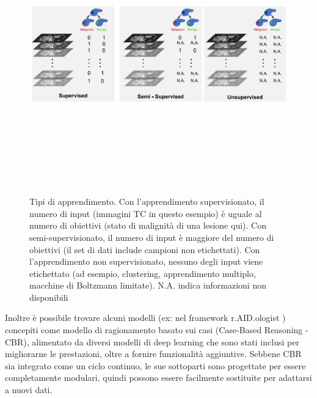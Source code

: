 \documentclass[12pt,a4paper]{report}
\begin{document}
\begin{figure}[h!]
    \begin{center}
        \includegraphics[width=12cm,height=12cm,keepaspectratio]{Type-of-learning}
    \end{center}
    \caption{Tipi di apprendimento. Con l'apprendimento supervisionato, il numero di input (immagini TC in questo esempio) è uguale al numero di obiettivi (stato di malignità di una lesione qui). Con semi-supervisionato, il numero di input è maggiore del numero di obiettivi (il set di dati include campioni non etichettati). Con l'apprendimento non supervisionato, nessuno degli input viene etichettato (ad esempio, clustering, apprendimento multiplo, macchine di Boltzmann limitate). N.A. indica informazioni non disponibili}
    \label{fig:type-of-learning}
\end{figure}


Inoltre è possibile trovare alcuni modelli (ex: nel framework r.AID.ologist \cite{r.AID.ologist}) concepiti come modello di ragionamento basato sui casi (Case-Based Reasoning - CBR), alimentato da diversi modelli di deep learning che sono stati inclusi per migliorarne le prestazioni, oltre a fornire funzionalità aggiuntive.
Sebbene CBR sia integrato come un ciclo continuo, le sue sottoparti sono progettate per essere completamente modulari, quindi possono essere facilmente sostituite per adattarsi a nuovi dati.
\end{document}
